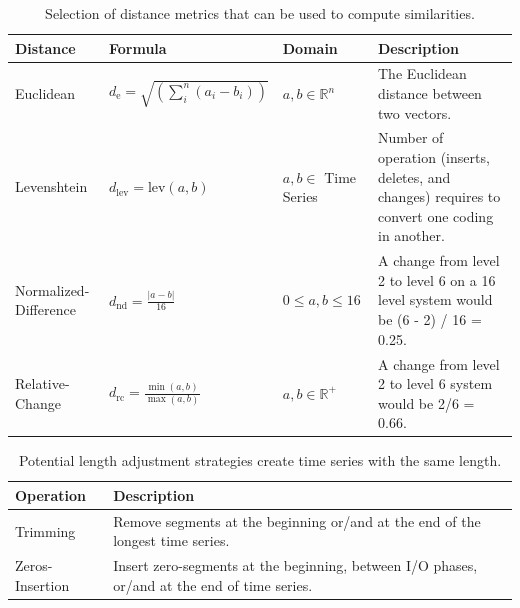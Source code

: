 \documentclass{jhps}
\begin{document}
\begin{table}
  \centering
  \begin{tabularx}{\textwidth}{lllX}
    Distance              & Formula                                       & Domain                  & Description                                                                                    \\
    \midrule
    Euclidean             & $d_{\text{e}} =\sqrt{(\sum_i^n (a_i - b_i))}$ & $a, b \in \mathbb{R}^n$ & The Euclidean distance between two vectors.                                                    \\
    Levenshtein           & $d_{\text{lev}} = \text{lev}(a, b)$           & $a, b \in$ Time Series  & Number of operation (inserts, deletes, and changes) requires to convert one coding in another. \\
    Normalized-Difference & $d_{\text{nd}} = \frac{|a - b|}{16}$          & $0 \le a, b \le 16$     & A change from level 2 to level 6 on a 16 level system would be (6 - 2) / 16 = 0.25.            \\
    Relative-Change       & $d_{\text{rc}} = \frac{\min(a,b)}{\max(a,b)}$ & $a, b \in \mathbb{R}^+$ & A change from level 2 to level 6 system would be 2/6 = 0.66.                                   \\
  \end{tabularx}
  \caption{Selection of distance metrics that can be used to compute similarities.}
  \label{tab:sim_funcs}
\end{table}

\begin{table}
  \centering
    \begin{tabularx}{\textwidth}{lX}
      Operation       & Description                                                                                  \\
      \midrule
      Trimming        & Remove segments at the beginning or/and at the end of the longest time series. \\
      Zeros-Insertion & Insert zero-segments at the beginning, between I/O phases, or/and at the end of time series. \\
    \end{tabularx}
    \caption{Potential length adjustment strategies create time series with the same length.}
  \label{tab:matching_strategies}
\end{table}
\end{document}
